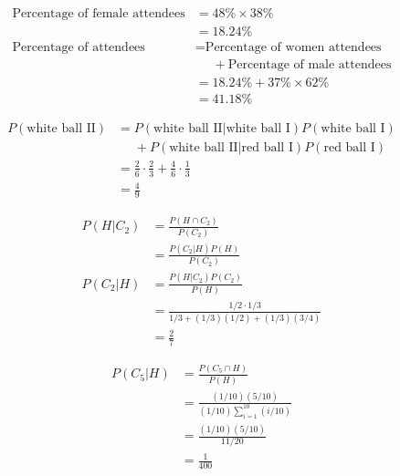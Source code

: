 \documentclass[12pt]{article}
\newenvironment{problem}[2][Problem]{\begin{trivlist}
\item[\hskip \labelsep {\bfseries #1}\hskip \labelsep {\bfseries #2.}]}{\end{trivlist}}
\begin{document}
\begin{problem}{4}
\end{problem}
\begin{align*}
	\text{Percentage of female attendees} &= 48\% \times 38\% \\
	&= 18.24\% \\
	\text{Percentage of attendees} &= \text{Percentage of women attendees} \\
	&\phantom{=}+ \text{Percentage of male attendees} \\
	&= 18.24\% + 37\% \times 62\% \\
	&= 41.18\%
\end{align*}
\filbreak

\begin{problem}{5}
\end{problem}
\begin{align*}
	P(\text{white ball II}) &= 
	P(\text{white ball II$|$white ball I}) P(\text{white ball I}) \\
	&\phantom{=} + P(\text{white ball II$|$red ball I}) P(\text{red ball I}) \\
	&= \frac{2}{6} \cdot \frac{2}{3} + \frac{4}{6} \cdot \frac{1}{3} \\
	&= \frac{4}{9}
\end{align*}
\filbreak

\begin{problem}{6}
\end{problem}
\begin{align*}
	P(H|C_2) &= \frac{P(H \cap C_2)} {P(C_2)} \\
	&= \frac{P(C_2|H) P(H)} {P(C_2)} \\
	P(C_2|H) &= \frac{P(H|C_2) P(C_2)} {P(H)} \\
	&= \frac{1/2 \cdot 1/3} {1/3 + (1/3)(1/2) + (1/3)(3/4)} \\
	&= \frac{2}{7}
\end{align*}
\filbreak

\begin{problem}{7}
\end{problem}
\begin{align*}
	P(C_5|H) &= \frac{P(C_5 \cap H)} {P(H)} \\
	&= \frac{(1/10)(5/10)} {(1/10)\sum_{i=1}^{10} (i/10)} \\
	&= \frac{(1/10)(5/10)} {11/20} \\
	&= \frac{1} {400} \\
\end{align*}
\filbreak
\end{document}
